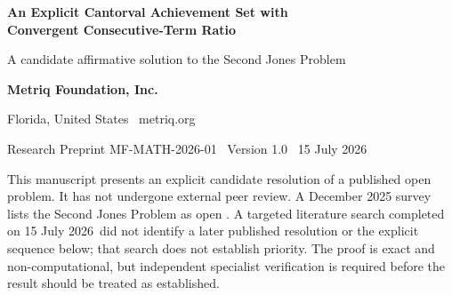 \documentclass[11pt,letterpaper]{article}
\theoremstyle{metriqthm}
\theoremstyle{metriqdef}
\newcommand{\E}{\mathcal{E}}
\newcommand{\paperdate}{15 July 2026}
\begin{document}
\setcounter{page}{1}

\begin{center}
  {\sffamily\bfseries\fontsize{21}{25}\selectfont\color{MetriqCharcoal}
    An Explicit Cantorval Achievement Set with\\[1mm]
    Convergent Consecutive-Term Ratio\par}
  \vspace{3mm}
  {\sffamily\large\color{MetriqTeal}
    A candidate affirmative solution to the Second Jones Problem\par}
  \vspace{5mm}
  {\sffamily\bfseries\large Metriq Foundation, Inc.\par}
  \vspace{1mm}
  {\sffamily\small\color{MetriqMuted}Florida, United States \textbullet\ metriq.org\par}
  \vspace{1mm}
  {\sffamily\small\color{MetriqMuted}Research Preprint MF-MATH-2026-01 \textbullet\ Version 1.0 \textbullet\ \paperdate\par}
\end{center}

\vspace{3mm}
\begin{statusbox}
This manuscript presents an explicit candidate resolution of a published open problem. It has not undergone external peer review. A December 2025 survey lists the Second Jones Problem as open \cite[Problem~4]{GlabPrus2025}. A targeted literature search completed on \paperdate\ did not identify a later published resolution or the explicit sequence below; that search does not establish priority. The proof is exact and non-computational, but independent specialist verification is required before the result should be treated as established.
\end{statusbox}

\begin{abstract}
For a summable positive sequence $x=(x_k)$, its achievement set is the compact set of all subsums
\[
  \E(x)=\left\{\sum_{k=1}^{\infty}\varepsilon_kx_k:\varepsilon_k\in\{0,1\}\right\}.
\]
The Second Jones Problem asks whether there is a sequence for which the consecutive-term ratio has a limit while the achievement set is a Cantorval. We give the explicit construction
\[
  x_{2n-1}=\frac{8n+17}{4^n},
  \qquad
  x_{2n}=\frac{4n+18}{4^n}
  \qquad(n\ge 1).
\]
We prove that $x$ is strictly decreasing and summable, that
$\lim_{k\to\infty}x_{k+1}/x_k=1/2$, that $\E(x)$ has nonempty interior, and that $\E(x)$ has infinitely many gaps. The interior argument is driven by the fact that the four pair-digits form a complete residue system modulo $4$ at every scale. The gaps follow from an exact tail identity. The Guthrie--Nymann classification theorem, with the corrected proof of Nymann and S\'aenz, then implies that $\E(x)$ is a Cantorval. Subject to independent verification, this gives an affirmative answer to the Second Jones Problem.
\end{abstract}
\end{document}
